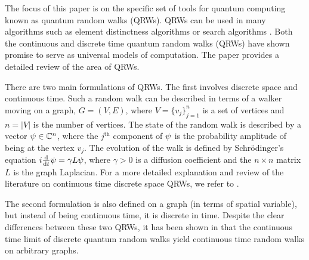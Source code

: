 \documentclass{siamart1116}
\begin{document}
The focus of this paper is on the specific set of tools for quantum computing known as quantum random walks (QRWs). QRWs can be used in many algorithms such as element distinctness algorithms \cite{ambainis_2007} or search algorithms \cite{shenvi_2003}. 
Both the continuous \cite{childs_2009} and discrete \cite{lovett_2010} time quantum random walks 
(QRWs) have shown promise to serve as universal models of computation.
The paper \cite{venegas} provides a detailed review of the area of QRWs.

There are two main formulations of QRWs. The first involves discrete space and continuous time. 
Such a random walk can be described in terms of a walker moving on a graph, $G = (V,E)$, where
$V = \{v_j\}_{j=1}^{n}$ is a set of vertices and $n=|V|$ is the number of vertices. The state 
of the random walk is described by a vector ${\bf \psi}\in\mathbb{C}^n$, where the $j^{\text{th}}$ component of ${\bf \psi}$ is the probability amplitude of being at the vertex $v_j$. 
The evolution of the walk is 
defined by Schr\"odinger's equation $i\frac{\mathrm{d}}{\mathrm{d}t}{\bf \psi}= \gamma L {\bf \psi}$, 
where $\gamma>0$ is a diffusion coefficient and the $n\times n$ matrix $L$ is the graph Laplacian. For 
a more detailed explanation and review of the literature on continuous time discrete space QRWs, we refer to \cite[Sec.\ 2.4]{venegas}.

The second formulation is also 
defined on a graph (in terms of spatial variable), but instead of being continuous time, 
it is discrete in time. Despite the clear differences between these two QRWs, it has been shown in  \cite{childs_2010} that the continuous time limit of discrete quantum random walks yield continuous 
time random walks on arbitrary graphs.
\end{document}
